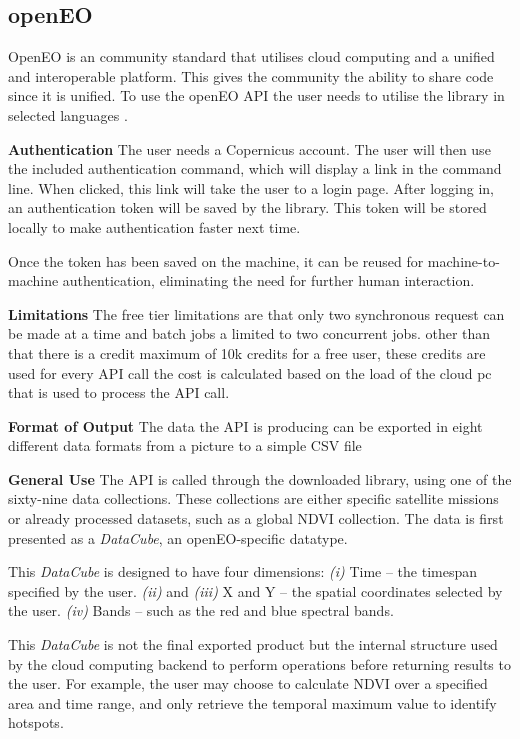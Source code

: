 \subsection{openEO}
OpenEO is an community standard that utilises cloud computing and a unified and interoperable platform. This gives the community the ability to share code since it is unified. To use the openEO API the user needs to utilise the library in selected languages \cite{copernicusOpenEOx2013}. 

\textbf{Authentication}
The user needs a Copernicus account. The user will then use the included authentication command, which will display a link in the command line. When clicked, this link will take the user to a login page. After logging in, an authentication token will be saved by the library. This token will be stored locally to make authentication faster next time.

Once the token has been saved on the machine, it can be reused for machine-to-machine authentication, eliminating the need for further human interaction.

\textbf{Limitations}
The free tier limitations are that only two synchronous request can be made at a time and batch jobs a limited to two concurrent jobs. other than that there is a credit maximum of 10k credits for a free user, these credits are used for every API call the cost is calculated based on the load of the cloud pc that is used to process the API call.

\textbf{Format of Output}
The data the API is producing can be exported in eight different data formats from a picture to a simple CSV file

\textbf{General Use}
The API is called through the downloaded library, using one of the sixty-nine data collections. These collections are either specific satellite missions or already processed datasets, such as a global NDVI collection. The data is first presented as a \textit{DataCube}, an openEO-specific datatype.

This \textit{DataCube} is designed to have four dimensions:  
\textit{(i)} Time – the timespan specified by the user.  
\textit{(ii)} and \textit{(iii)} X and Y – the spatial coordinates selected by the user.  
\textit{(iv)} Bands – such as the red and blue spectral bands.

This \textit{DataCube} is not the final exported product but the internal structure used by the cloud computing backend to perform operations before returning results to the user. For example, the user may choose to calculate NDVI over a specified area and time range, and only retrieve the temporal maximum value to identify hotspots.

